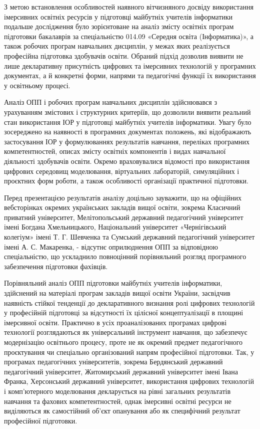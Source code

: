 З метою встановлення особливостей наявного вітчизняного досвіду використання імерсивних освітніх ресурсів у підготовці майбутніх учителів інформатики подальше дослідження було зорієнтоване на аналіз змісту освітніх програм підготовки бакалаврів за спеціальністю 014.09 «Середня освіта (Інформатика)», а також робочих програм навчальних дисциплін, у межах яких реалізується професійна підготовка здобувачів освіти. Обраний підхід дозволив виявити не лише декларативну присутність цифрових та імерсивних технологій у програмних документах, а й конкретні форми, напрями та педагогічні функції їх використання у освітньому процесі.

Аналіз ОПП і робочих програм навчальних дисциплін здійснювався з урахуванням змістових і структурних критеріїв, що дозволили виявити реальний стан використання ІОР у підготовці майбутніх учителів інформатики. Увагу було зосереджено на наявності в програмних документах положень, які відображають застосування ІОР у формулюваннях результатів навчання, переліках програмних компетентностей, описах змісту освітніх компонентів і видах навчальної діяльності здобувачів освіти. Окремо враховувалися відомості про використання цифрових середовищ моделювання, віртуальних лабораторій, симуляційних і проєктних форм роботи, а також особливості організації практичної підготовки.

Перед презентацією результатів аналізу доцільно зауважити, що на офіційних вебсторінках окремих українських закладів вищої освіти, зокрема Класичний приватний університет, Мелітопольський державний педагогічний університет імені Богдана Хмельницького, Національний університет «Чернігівський колегіум» імені Т. Г. Шевченка та Сумський державний педагогічний університет імені А. С. Макаренка, - відсутнє оприлюднення ОПП за відповідною спеціальністю, що ускладнило повноцінний порівняльний розгляд програмного забезпечення підготовки фахівців.

Порівняльний аналіз ОПП підготовки майбутніх учителів інформатики, здійснений на матеріалі програм закладів вищої освіти України, засвідчив наявність стійкої тенденції до декларативного визнання ролі цифрових технологій у професійній підготовці за відсутності їх цілісної концептуалізації в площині імерсивної освіти. Практично в усіх проаналізованих програмах цифрові технології розглядаються як універсальний інструмент навчання, що забезпечує модернізацію освітнього процесу, проте не як окремий предмет педагогічного проєктування чи спеціально організований напрям професійної підготовки. Так, у програмах педагогічних університетів, зокрема Бердянський державний педагогічний університет, Житомирський державний університет імені Івана Франка, Херсонський державний університет, використання цифрових технологій і комп'ютерного моделювання декларується на рівні загальних результатів навчання та фахових компетентностей, однак імерсивні освітні ресурси не виділяються як самостійний об'єкт опанування або як специфічний результат професійної підготовки.

